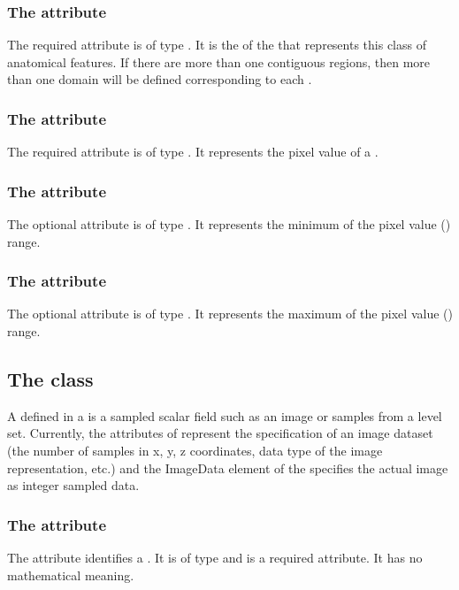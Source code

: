\subsubsection{The  attribute}
The required  attribute is of type . It is the  of the \DomainType that represents this class of anatomical features. If there are more than one contiguous regions, then more than one domain will be defined corresponding to each \SampledVolume.

\subsubsection{The  attribute}
The required  attribute is of type . It represents the pixel value of a \SampledVolume.

\subsubsection{The  attribute}
The optional  attribute is of type . It represents the minimum of the pixel value () range.

\subsubsection{The  attribute}
The optional  attribute is of type . It represents the maximum of the pixel value () range.


\subsection{The  class}
\label{SampledField-class}
A \SampledField defined in a \SampledFieldGeometry is a sampled scalar field such as an image or samples from a level set. Currently, the attributes of \SampledField represent the specification of an image dataset (the number of samples in x, y, z coordinates, data type of the image representation, etc.) and the ImageData element of the \SampledField specifies the actual image as integer sampled data.

\subsubsection{The  attribute}
The  attribute identifies a \SampledField. It is of type  and is a required attribute.  It has no mathematical meaning.

